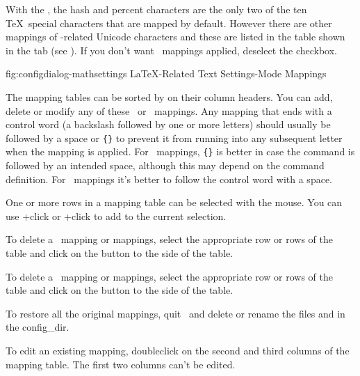 
With the \mathstool, the \gls{hash} and \gls{percent} characters are the
only two of the ten \TeX\ special characters that are mapped by
default. However there are other mappings of -related Unicode
characters and these are listed in the table shown in the
 tab (see
). If you don't want
\mathsmode\ mappings applied, deselect the
 \gls*{checkbox}.

\FloatFig
  {fig:configdialog-mathsettings}
  {}
  {LaTeX-Related Text Settings\dash {}-Mode Mappings}

The mapping tables can be sorted by  on
their column headers. You can add, delete or modify any of these
\textmode\ or \mathsmode\ mappings. Any mapping that ends with a control
word (a backslash followed by one or more letters) should
usually be followed by a space or \verb|{}| to prevent it from
running into any subsequent letter when the mapping is applied. For
\textmode\ mappings, \verb|{}| is better in case the command is
followed by an intended space, although this may depend on the
command definition. For \mathsmode\ mappings it's better
to follow the control word with a space.

One or more rows in a mapping table can be selected with the mouse.
You can use +\gls{click} or 
+\gls{click} to add to the
current selection.


To delete a \textmode\ mapping or mappings, select the appropriate row or rows of the
 table and click on the
 button
to the side of the table. 


To delete a \mathsmode\ mapping or mappings, select the appropriate row or rows of the
 table and click on the
 button
to the side of the table. 

To restore all the original mappings, quit \FlowframTk\ and delete
or rename the files  and
 in the \gls{config_dir}.

To edit an existing mapping, \gls{doubleclick} on the second and
third columns of the mapping table. The first two columns can't be
edited.

